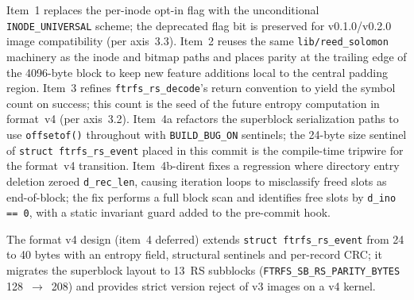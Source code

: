 Item~1 replaces the per-inode opt-in flag with the unconditional
\texttt{INODE\_UNIVERSAL} scheme; the deprecated flag bit is
preserved for v0.1.0/v0.2.0 image compatibility (per axis~3.3).
Item~2 reuses the same \texttt{lib/reed\_solomon} machinery as the
inode and bitmap paths and places parity at the trailing edge of
the 4096-byte block to keep new feature additions local to the
central padding region. Item~3 refines
\texttt{ftrfs\_rs\_decode}'s return convention to yield the symbol
count on success; this count is the seed of the future entropy
computation in format~v4 (per axis~3.2). Item~4a refactors the
superblock serialization paths to use \texttt{offsetof()} throughout
with \texttt{BUILD\_BUG\_ON} sentinels; the 24-byte size sentinel
of \texttt{struct ftrfs\_rs\_event} placed in this commit is the
compile-time tripwire for the format~v4 transition. Item~4b-dirent
fixes a regression where directory entry deletion zeroed
\texttt{d\_rec\_len}, causing iteration loops to misclassify freed
slots as end-of-block; the fix performs a full block scan and
identifies free slots by \texttt{d\_ino == 0}, with a static
invariant guard added to the pre-commit hook.

The format v4 design (item~4 deferred) extends
\texttt{struct ftrfs\_rs\_event} from 24 to 40 bytes with an
entropy field, structural sentinels and per-record CRC; it
migrates the superblock layout to 13~RS subblocks
(\texttt{FTRFS\_SB\_RS\_PARITY\_BYTES} 128~$\to$~208) and provides
strict version reject of v3 images on a v4 kernel.
